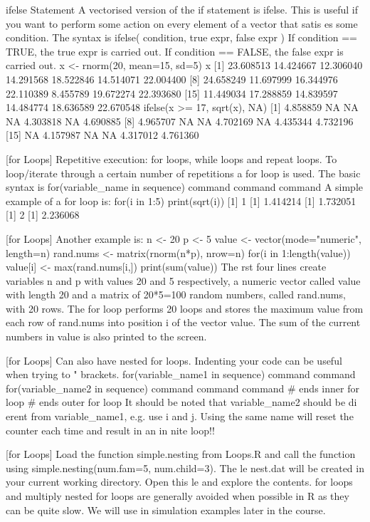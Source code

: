 \documentclass[a4paper,12pt]{article}
\begin{document}
ifelse Statement
A vectorised version of the if statement is ifelse. This is useful
if you want to perform some action on every element of a vector
that satis es some condition.
The syntax is
ifelse( condition, true expr, false expr )
If condition == TRUE, the true expr is carried out. If
condition == FALSE, the false expr is carried out.
x <- rnorm(20, mean=15, sd=5)
x
[1] 23.608513 14.424667 12.306040 14.291568 18.522846 14.514071 22.004400
[8] 24.658249 11.697999 16.344976 22.110389 8.455789 19.672274 22.393680
[15] 11.449034 17.288859 14.839597 14.484774 18.636589 22.670548
ifelse(x >= 17, sqrt(x), NA)
[1] 4.858859 NA NA NA 4.303818 NA 4.690885
[8] 4.965707 NA NA 4.702169 NA 4.435344 4.732196
[15] NA 4.157987 NA NA 4.317012 4.761360



[for Loops]
Repetitive execution: for loops, while loops and repeat loops.
To loop/iterate through a certain number of repetitions a for loop
is used. The basic syntax is
for(variable_name in sequence) {
command
command
command
}
A simple example of a for loop is:
for(i in 1:5){
print(sqrt(i))
}
[1] 1
[1] 1.414214
[1] 1.732051
[1] 2
[1] 2.236068

[for Loops]
Another example is:
n <- 20
p <- 5
value <- vector(mode="numeric", length=n)
rand.nums <- matrix(rnorm(n*p), nrow=n)
for(i in 1:length(value)){
value[i] <- max(rand.nums[i,])
print(sum(value))
}
The rst four lines create variables n and p with values 20 and 5
respectively, a numeric vector called value with length 20 and a
matrix of 20*5=100 random numbers, called rand.nums, with 20
rows.
The for loop performs 20 loops and stores the maximum value
from each row of rand.nums into position i of the vector value.
The sum of the current numbers in value is also printed to the
screen.

[for Loops]
Can also have nested for loops. Indenting your code can be useful
when trying to \match" brackets.
for(variable_name1 in sequence) {
command
command
for(variable_name2 in sequence) {
command
command
command
} # ends inner for loop
} # ends outer for loop
It should be noted that variable_name2 should be di erent from
variable_name1, e.g. use i and j. Using the same name will
reset the counter each time and result in an in nite loop!!

[for Loops]
Load the function simple.nesting from Loops.R and call the
function using
simple.nesting(num.fam=5, num.child=3).
The le nest.dat will be created in your current working
directory. Open this le and explore the contents.
for loops and multiply nested for loops are generally avoided
when possible in R as they can be quite slow. We will use in
simulation examples later in the course.
\end{document}
